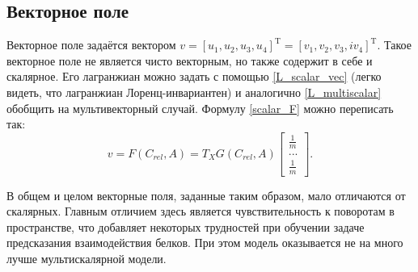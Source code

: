 \subsection{Векторное поле}
Векторное поле задаётся вектором $v = [u_1, u_2, u_3, u_4]^\mathrm{T} = [v_1, v_2, v_3, iv_4]^\mathrm{T}$. Такое векторное поле не является чисто векторным, но также содержит в себе и скалярное.
Его лагранжиан можно задать с помощью \ref{L_scalar_vec} (легко видеть, что лагранжиан Лоренц-инвариантен) и аналогично \ref{L_multiscalar} обобщить на мультивекторный случай.
Формулу \ref{scalar_F} можно переписать так:
\begin{equation}
	v = F(C_{rel}, A) = T_{X}G(C_{rel}, A)\begin{bmatrix} \frac{1}{m} \\ ... \\ \frac{1}{m} \end{bmatrix}.
	\label{vector_F}
\end{equation}

В общем и целом векторные поля, заданные таким образом, мало отличаются от скалярных. Главным отличием здесь является чувствительность к поворотам в пространстве,
что добавляет некоторых трудностей при обучении задаче предсказания взаимодействия белков. При этом модель оказывается не на много лучше мультискалярной модели.

